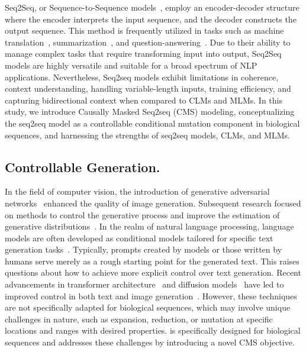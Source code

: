 Seq2Seq, or Sequence-to-Sequence models~\citep{dey2017gate,graves2012long,xue2020mt5,wang2020fairseq, ni2021sentence}, employ an encoder-decoder structure where the encoder interprets the input sequence, and the decoder constructs the output sequence. This method is frequently utilized in tasks such as machine translation~\citep{chen2018best,tiwari2020english,wang2022understanding}, summarization~\citep{prasad2020automatic,shi2021neural}, and question-answering~\citep{tang2018learning,wu2020seq2seq}. Due to their ability to manage complex tasks that require transforming input into output, Seq2Seq models are highly versatile and suitable for a broad spectrum of NLP applications.
Nevertheless, Seq2seq models exhibit limitations in coherence, context understanding, handling variable-length inputs, training efficiency, and capturing bidirectional context when compared to CLMs and MLMs. In this study, we introduce Causally Masked Seq2seq (CMS) modeling, conceptualizing the seq2seq model as a controllable conditional mutation component in biological sequences, and harnessing the strengths of seq2seq models, CLMs, and MLMs.













\subsection{Controllable Generation.}
In the field of computer vision, the introduction of generative adversarial networks~\citep{goodfellow2014generative}  enhanced the quality of image generation. Subsequent research focused on methods to control the generative process and improve the estimation of generative distributions~\citep{kingma2013auto,chen2016infogan,arjovsky2017wasserstein}. In the realm of natural language processing, language models are often developed as conditional models tailored for specific text generation tasks~\citep{brants2007large,sutskever2014sequence,rush2015neural}. Typically, prompts created by models or those written by humans serve merely as a rough starting point for the generated text. This raises questions about how to achieve more explicit control over text generation. Recent advancements in transformer architecture~\citep{vaswani2017attention,radford2019language} and diffusion models~\citep{ho2020denoising} have led to improved control in both text and image generation~\citep{li2019controllable,keskar2019ctrl,raffel2020exploring,li2022diffusion,epstein2023diffusion,zhang2023survey,liang2024controllable}. However, these techniques are not specifically adapted for biological sequences, which may involve unique challenges in nature, such as expansion, reduction, or mutation at specific locations and ranges with desired properties. 
\algname is specifically designed for biological sequences and addresses these challenges by introducing a novel CMS objective.


